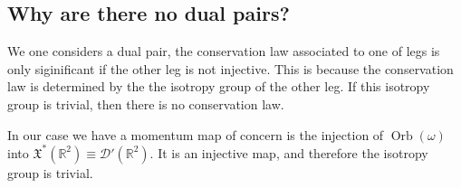 \documentclass[12pt]{amsart}
\newcommand{\R}{\ensuremath{\mathbb{R}}}
\DeclareMathOperator{\Emb}{Emb}
\DeclareMathOperator{\Jet}{Jet}
\DeclareMathOperator{\Orb}{Orb}
\begin{document}
\subsection{Why are there no dual pairs?}
\label{sec:dual_pairs}
We one considers a dual pair, the conservation law associated
to one of legs is only siginificant if the other leg is not injective.
This is because the conservation law is determined by the the isotropy group
of the other leg.  If this isotropy group is trivial, then there is no
conservation law.

In our case we have a momentum map of concern is the injection of $\Orb(\omega)$ into $\mathfrak{X}^*(\R^2) \equiv \mathcal{D}'(\R^2)$.
It is an injective map, and therefore the isotropy group is trivial.



\end{document}
